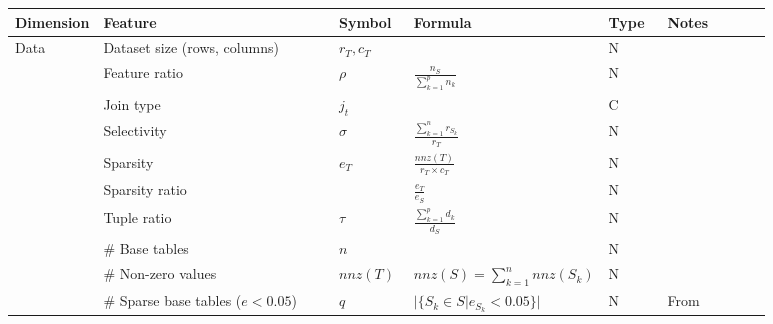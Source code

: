 \begin{tabular}{lp{0.35\linewidth}p{0.10\linewidth}>{\footnotesize}p{0.2\linewidth}p{0.08\linewidth}p{0.15\linewidth}}
  \toprule
  Dimension                              & Feature                                 & Symbol                            & Formula                                 & Type & Notes                                \\
  \midrule\midrule
  \multirow[t]{10}{*}{Data}              & Dataset size (rows, columns)            & $r_T, c_T$                        &                                         & N    &                                      \\
                                         & Feature ratio                           & $\rho$                            & $\frac{n_S}{\sum_{k=1}^p n_k} $         & N    &                                      \\
                                         & Join type                               & $j_t$                             &                                         & C    &                                      \\
                                         & Selectivity                             & $\sigma$                          & $\frac{\sum_{k=1}^{n}r_{S_k}}{r_T}$     & N    &                                      \\
                                         & Sparsity                                & $e_T$                             & $\frac{nnz(T)}{r_T\times c_T}$          & N    &                                      \\
                                         & Sparsity ratio                          &                                   & $\frac{e_T}{e_S}$                       & N    &                                      \\
                                         & Tuple ratio                             & $\tau$                            & $\frac{\sum_{k=1}^p d_k}{d_S}$          & N    &                                      \\
                                         & \# Base tables                          & $n$                               &                                         & N    &                                      \\
                                         & \# Non-zero values                      & $nnz(T)$                          & $nnz(S) = \sum_{k=1}^{n}nnz(S_k)$       & N    &                                      \\
                                         & \# Sparse base tables ($e < 0.05$)      & $q$                               & $|\{S_k \in S| e_{S_k} < 0.05\}|$       & N    & From~\cite{MorpheusFI}               \\


\end{tabular}
